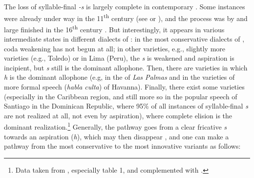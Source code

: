 \documentclass[output=paper,hidelinks]{langscibook}
\begin{document}
The loss of syllable-final \emph{-s} is largely complete in contemporary . Some instances were already under way in the 11\textsuperscript{th} century (see \citealt[53f.]{brunot33} or \citealt[196ff.]{marchello08}), and the process was by and large finished in the 16\textsuperscript{th} century \citep[see][70f.]{brunot33}. But interestingly, it appears in various intermediate states in different dialects of : in the most conservative dialects of , coda weakening has not begun at all; in other varieties, e.g., slightly more  varieties (e.g., Toledo) or in Lima (Peru), the \emph{s} is weakened and aspiration is incipient, but \emph{s} still is the dominant allophone. Then, there are varieties in which \emph{h} is the dominant allophone (e.g, in the  of \emph{Las Palmas} and in the varieties of more formal speech (\emph{habla culta}) of Havanna). Finally, there exist some varieties (especially in the Caribbean region, and still more so in the popular speech of Santiago in the Dominican Republic, where 95\% of all instances of syllable-final \emph{s} are not realized at all, not even by aspiration), where complete elision is the dominant realization.\footnote{Data taken from \citet{samper01}, especially table 1, and complemented with \citet[250]{kapovic17}.} Generally, the pathway goes from a clear fricative \emph{s} towards an aspiration (\emph{h}), which may then disappear \citep[see, e.g.][]{ferguson90}, and one can make a pathway from the most conservative to the most innovative variants as follows:
\end{document}
